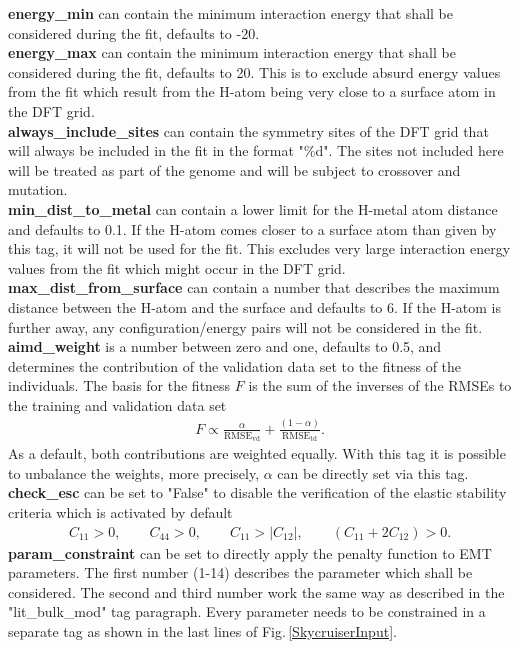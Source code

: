 \documentclass[twoside, 11pt, titlepage, captions=nooneline, a4paper, headsepline]{scrbook}%
\newcommand{\9}{\mathrm}
\newcommand{\0}{\,\mathrm}
\begin{document}
\textbf{energy\_min} can contain the minimum interaction energy that shall be considered during the fit, defaults to -20.\\
\textbf{energy\_max} can contain the minimum interaction energy that shall be considered during the fit, defaults to 20. This is to exclude absurd energy values from the fit which result from the H-atom being very close to a surface atom in the DFT grid.\\
\textbf{always\_include\_sites} can contain the symmetry sites of the DFT grid that will always be included in the fit in the format "\%d". The sites not included here will be treated as part of the genome and will be subject to crossover and mutation.\\
\textbf{min\_dist\_to\_metal} can contain a lower limit for the H-metal atom distance and defaults to 0.1. If the H-atom comes closer to a surface atom than given by this tag, it will not be used for the fit. This excludes very large interaction energy values from the fit which might occur in the DFT grid.\\
\textbf{max\_dist\_from\_surface} can contain a number that describes the maximum distance between the H-atom and the surface and defaults to 6. If the H-atom is further away, any configuration/energy pairs will not be considered in the fit.\\
\textbf{aimd\_weight} is a number between zero and one, defaults to 0.5, and determines the contribution of the validation data set to the fitness of the individuals. The basis for the fitness $F$ is the sum of the inverses of the RMSEs to the training and validation data set
\begin{align*}
	F \propto \frac{\alpha}{\9{RMSE}_\9{vd}} + \frac{(1-\alpha)}{\9{RMSE}_\9{td}}.
\end{align*}
As a default, both contributions are weighted equally. With this tag it is possible to unbalance the weights, more precisely, $\alpha$ can be directly set via this tag.\\
\textbf{check\_esc} can be set to "False" to disable the verification of the elastic stability criteria which is activated by default
\begin{align*}
	C_{11} > 0,\qquad C_{44} > 0,\qquad C_{11} > |C_{12}|,\qquad (C_{11} + 2C_{12}) > 0.
\end{align*}
\textbf{param\_constraint} can be set to directly apply the penalty function to EMT parameters. The first number (1-14) describes the parameter which shall be considered. The second and third number work the same way as described in the "lit\_bulk\_mod" tag paragraph. Every parameter needs to be constrained in a separate tag as shown in the last lines of Fig.\,\ref{SkycruiserInput}.
\end{document}
